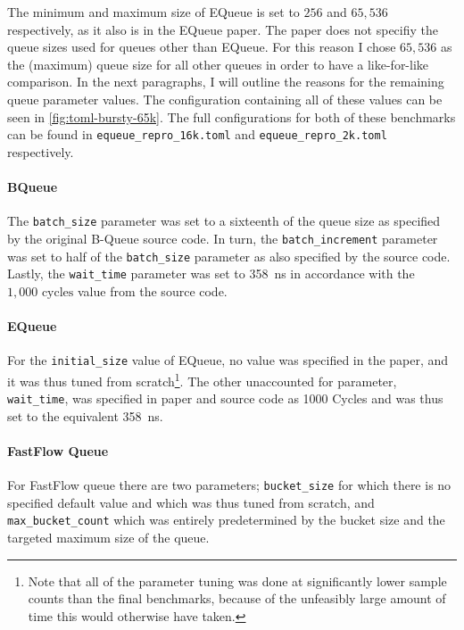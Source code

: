The minimum and maximum size of EQueue is set to $256$ and $65,536$ respectively, as it also is in the EQueue paper.
The paper does not specifiy the queue sizes used for queues other than EQueue.
For this reason I chose $65,536$ as the (maximum) queue size for all other queues in order to have a
like-for-like comparison.
In the next paragraphs, I will outline the reasons for the remaining queue parameter values.
The configuration containing all of these values can be seen in \autoref{fig:toml-bursty-65k}.
The full configurations for both of these benchmarks can be found in \texttt{equeue\_repro\_16k.toml} and
\texttt{equeue\_repro\_2k.toml} respectively.



\paragraph{BQueue}
The \texttt{batch\_size} parameter was set to a sixteenth of the queue size as specified by the original
B-Queue source code.
In turn, the \texttt{batch\_increment} parameter was set to half of the \texttt{batch\_size} parameter as
also specified by the source code.
Lastly, the \texttt{wait\_time} parameter was set to \SI{358}{\nano\second} in accordance with the
$1,000\text{ cycles}$ value from the source code.

\paragraph{EQueue}
For the \texttt{initial\_size} value of EQueue, no value was specified in the paper, and it was thus tuned
from scratch\footnote{Note that all of the parameter tuning was done at significantly lower sample counts
than the final benchmarks, because of the unfeasibly large amount of time this would otherwise have taken.}.
The other unaccounted for parameter, \texttt{wait\_time}, was specified in paper and source code as 1000
Cycles and was thus set to the equivalent \SI{358}{\nano\second}.

\paragraph{FastFlow Queue}
For FastFlow queue there are two parameters; \texttt{bucket\_size} for which there is no specified default
value and which was thus tuned from scratch, and \texttt{max\_bucket\_count} which was entirely predetermined by
the bucket size and the targeted maximum size of the queue.

